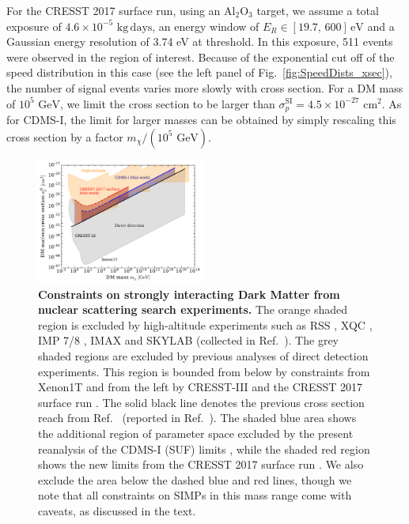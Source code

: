 \documentclass[prd,twocolumn,showpacs,nofootinbib,aps]{revtex4-1}
\begin{document}
For the CRESST 2017 surface run, using an $\mathrm{Al}_2\mathrm{O}_3$ target, we assume a total exposure of $4.6 \times 10^{-5}\,\,\mathrm{kg} \,\mathrm{days}$, an energy window of $E_R \in [19.7, \, 600] \,\mathrm{eV}$ and a Gaussian energy resolution of 3.74 eV at threshold. In this exposure, 511 events were observed in the region of interest. Because of the exponential cut off of the speed distribution in this case (see the left panel of Fig.~\ref{fig:SpeedDists_xsec}), the number of signal events varies more slowly with cross section. For a DM mass of $10^5 \,\,\mathrm{GeV}$, we limit the cross section to be larger than $\sigma_p^\mathrm{SI} = 4.5 \times 10^{-27}\,\,\mathrm{cm}^2$. As for CDMS-I, the limit for larger masses can be obtained by simply rescaling this cross section by a factor $m_\chi/(10^5\,\,\mathrm{GeV})$.


\begin{figure}[t]
\centering
\includegraphics[width=0.49\textwidth,]{plots/Constraints1.pdf}
\caption{\textbf{Constraints on strongly interacting Dark Matter from nuclear scattering search experiments.} The orange shaded region is excluded by high-altitude experiments such as RSS \cite{Rich1987}, XQC \cite{Zaharijas:2004jv,Erickcek:2007jv}, IMP 7/8 \cite{SnowdenIfft1990}, IMAX \cite{McGuire:1994pq} and SKYLAB \cite{Shirk1978} (collected in Ref.~\cite{Mack:2007xj}). The grey shaded regions are excluded by previous analyses of direct detection experiments. This region is bounded from below by constraints from Xenon1T \cite{Aprile:2017iyp} and from the left by CRESST-III \cite{Petricca:2017zdp} and the CRESST 2017 surface run \cite{Angloher:2017sxg,Davis:2017noy}. The solid black line denotes the previous cross section reach from Ref.~\cite{Albuquerque:2003ei} (reported in Ref.~\cite{Mack:2007xj}). The shaded blue area shows the additional region of parameter space excluded by the present reanalysis of the CDMS-I (SUF) limits \cite{Abusaidi:2000wg,Abrams:2002nb}, while the shaded red region shows the new limits from the CRESST 2017 surface run \cite{Angloher:2017sxg}. We also exclude the area below the dashed blue and red lines, though we note that all constraints on SIMPs in this mass range come with caveats, as discussed in the text.}
\label{fig:constraints}
\end{figure}
\end{document}

